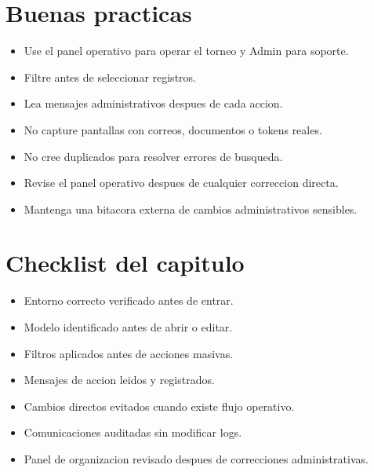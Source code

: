 \section{Buenas practicas}

\begin{itemize}
    \item Use el panel operativo para operar el torneo y Admin para soporte.
    \item Filtre antes de seleccionar registros.
    \item Lea mensajes administrativos despues de cada accion.
    \item No capture pantallas con correos, documentos o tokens reales.
    \item No cree duplicados para resolver errores de busqueda.
    \item Revise el panel operativo despues de cualquier correccion directa.
    \item Mantenga una bitacora externa de cambios administrativos sensibles.
\end{itemize}

\section{Checklist del capitulo}

\begin{itemize}
    \item Entorno correcto verificado antes de entrar.
    \item Modelo identificado antes de abrir o editar.
    \item Filtros aplicados antes de acciones masivas.
    \item Mensajes de accion leidos y registrados.
    \item Cambios directos evitados cuando existe flujo operativo.
    \item Comunicaciones auditadas sin modificar logs.
    \item Panel de organizacion revisado despues de correcciones administrativas.
\end{itemize}
